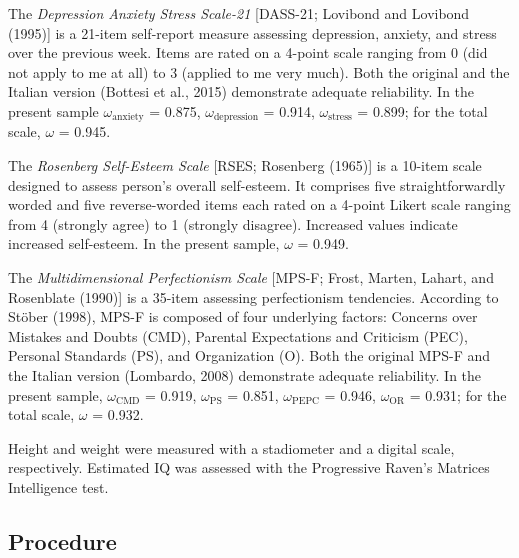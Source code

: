 \documentclass[
  man,floatsintext]{apa6}
\begin{document}
The \emph{Depression Anxiety Stress Scale-21} {[}DASS-21; Lovibond and Lovibond (1995){]} is a 21-item self-report measure assessing depression, anxiety, and stress over the previous week. Items are rated on a 4-point scale ranging from 0 (did not apply to me at all) to 3 (applied to me very much). Both the original and the Italian version (Bottesi et al., 2015) demonstrate adequate reliability. In the present sample \(\omega_{\text{anxiety}}\) = 0.875, \(\omega_{\text{depression}}\) = 0.914, \(\omega_{\text{stress}}\) = 0.899; for the total scale, \(\omega\) = 0.945.

The \emph{Rosenberg Self-Esteem Scale} {[}RSES; Rosenberg (1965){]} is a 10-item scale designed to assess person's overall self-esteem. It comprises five straightforwardly worded and five reverse-worded items each rated on a 4-point Likert scale ranging from 4 (strongly agree) to 1 (strongly disagree). Increased values indicate increased self-esteem. In the present sample, \(\omega\) = 0.949.

The \emph{Multidimensional Perfectionism Scale} {[}MPS-F; Frost, Marten, Lahart, and Rosenblate (1990){]} is a 35-item assessing perfectionism tendencies. According to Stöber (1998), MPS-F is composed of four underlying factors: Concerns over Mistakes and Doubts (CMD), Parental Expectations and Criticism (PEC), Personal Standards (PS), and Organization (O). Both the original MPS-F and the Italian version (Lombardo, 2008) demonstrate adequate reliability. In the present sample, \(\omega_{\text{CMD}}\) = 0.919, \(\omega_{\text{PS}}\) = 0.851, \(\omega_{\text{PEPC}}\) = 0.946, \(\omega_{\text{OR}}\) = 0.931; for the total scale, \(\omega\) = 0.932.

Height and weight were measured with a stadiometer and a digital scale, respectively. Estimated IQ was assessed with the Progressive Raven's Matrices Intelligence test.

\hypertarget{procedure}{%
\subsection{Procedure}\label{procedure}}
\end{document}

